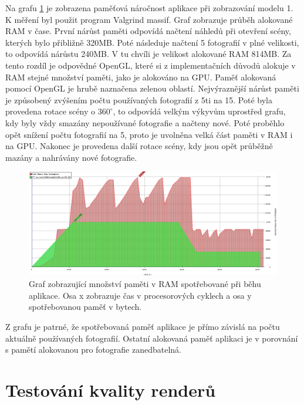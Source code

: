 \documentclass[11pt,twoside,a4paper]{book}
\begin{document}
Na grafu \ref{fig:massif} je zobrazena paměťová náročnost aplikace při zobrazování modelu 1. K měření byl použit program Valgrind massif. Graf zobrazuje průběh alokované RAM v čase. První nárůst paměti odpovídá načtení náhledů při otevření scény, kterých bylo přibližně 320MB. Poté následuje načtení 5 fotografií v plné velikosti, to odpovídá nárůstu 240MB. V tu chvíli je velikost alokované RAM 814MB. Za tento rozdíl je odpovědné OpenGL, které si z implementačních důvodů alokuje v RAM stejné množství paměti, jako je alokováno na GPU. Paměť alokovaná pomocí OpenGL je hrubě naznačena zelenou oblastí. Nejvýraznější nárůst paměti je způsobený zvýšením počtu používaných fotografií z 5ti na 15. Poté byla provedena rotace scény o $360^{\circ}$, to odpovídá velkým výkyvům uprostřed grafu, kdy byly vždy smazány nepoužívané fotografie a načteny nové. Poté proběhlo opět snížení počtu fotografií na 5, proto je uvolněna velká část paměti v RAM i na GPU. Nakonec je provedena další rotace scény, kdy jsou opět průběžně mazány a nahrávány nové fotografie.

\begin{figure}[h]
\begin{center}
\includegraphics[width=\textwidth]{figures/massif}
\caption{Graf zobrazující množství paměti v RAM spotřebované při běhu aplikace. Osa x zobrazuje čas v procesorových cyklech a osa y spotřebovanou paměť v bytech.}
\label{fig:massif}
\end{center}
\end{figure}

Z grafu je patrné, že spotřebovaná paměť aplikace je přímo závislá na počtu aktuálně používaných fotografií. Ostatní alokovaná paměť aplikaci je v porovnání s pamětí alokovanou pro fotografie zanedbatelná.

\section{Testování kvality renderů}
\label{sec:renders}
\end{document}
